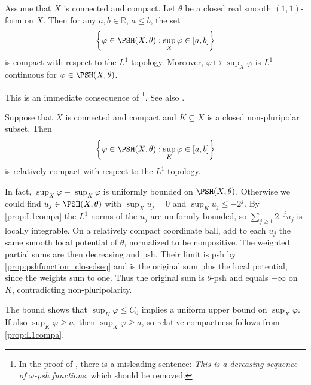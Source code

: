 \begin{proposition}\label{prop:L1compa}Assume that $X$ is connected and compact.
    Let $\theta$ be a closed real smooth $(1,1)$-form on $X$. Then for any $a,b\in \mathbb{R}$, $a\leq b$, the set
    \[
        \left\{ \varphi\in \PSH(X,\theta): \sup_X \varphi \in [a,b]\right\}
    \]
    is compact with respect to the $L^1$-topology. Moreover, $\varphi\mapsto \sup_X \varphi$ is $L^1$-continuous for $\varphi\in \PSH(X,\theta)$.
\end{proposition}
This is an immediate consequence of \cite[Proposition~8.5, Exercise~1.20]{GZ17}\footnote{In the proof of \cite[Proposition~8.5]{GZ17}, there is a misleading sentence: \emph{This is a dcreasing sequence of $\omega$-psh functions}, which should be removed.}. See also \cite[Proposition~14.2.1]{FPT}.
\begin{remark}\label{rmk:L1cpt}
    Suppose that $X$ is connected and compact and $K\subseteq X$ is a closed non-pluripolar subset. Then
    \[
        \left\{ \varphi\in \PSH(X,\theta): \sup_K \varphi \in [a,b]\right\}
    \]
    is relatively compact with respect to the $L^1$-topology.

    In fact, $\sup_X\varphi-\sup_K\varphi$ is uniformly bounded on $\PSH(X,\theta)$. Otherwise we could find $u_j\in\PSH(X,\theta)$ with $\sup_X u_j=0$ and $\sup_K u_j\leq-2^j$. By \cref{prop:L1compa} the $L^1$-norms of the $u_j$ are uniformly bounded, so $\sum_{j\geq 1}2^{-j}u_j$ is locally integrable. On a relatively compact coordinate ball, add to each $u_j$ the same smooth local potential of $\theta$, normalized to be nonpositive. The weighted partial sums are then decreasing and psh. Their limit is psh by \cref{prop:pshfunction_closedseq} and is the original sum plus the local potential, since the weights sum to one. Thus the original sum is $\theta$-psh and equals $-\infty$ on $K$, contradicting non-pluripolarity.

    The bound shows that $\sup_K\varphi\leq C_0$ implies a uniform upper bound on $\sup_X\varphi$. If also $\sup_K\varphi\geq a$, then $\sup_X\varphi\geq a$, so relative compactness follows from \cref{prop:L1compa}.
\end{remark}

